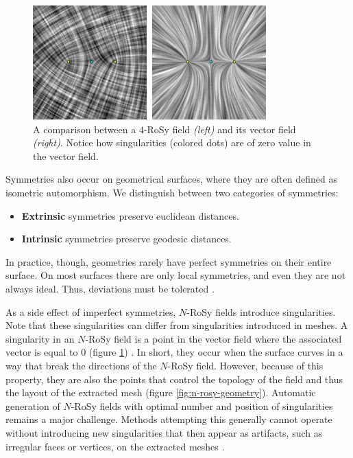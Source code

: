 \documentclass{ACGSeminar}
\begin{document}
\begin{figure}[htb!]
	\begin{centering}
		\includegraphics[width=9cm]{img/n-Rosy-Singularity.png}\par
	\end{centering}
	\caption{A comparison between a $4$-RoSy field \textit{(left)} and its vector field \textit{(right)}. Notice how singularities (colored dots) are of zero value in the vector field. \cite{palacios2007rotational}}
	\label{fig:n-rosy-singularities}
\end{figure}

Symmetries also occur on geometrical surfaces, where they are often defined as isometric automorphism. We distinguish between two categories of symmetries:
\begin{itemize}
	\item	\textbf{Extrinsic} symmetries preserve euclidean distances.
	\item	\textbf{Intrinsic} symmetries preserve geodesic distances.
\end{itemize}
In practice, though, geometries rarely have perfect symmetries on their entire surface. On most surfaces there are only local symmetries, and even they are not always ideal. Thus, deviations must be tolerated \cite{panozzo2012fields}.\bigskip

As a side effect of imperfect symmetries, $N$-RoSy fields introduce singularities. Note that these singularities can differ from singularities introduced in meshes. A singularity in an $N$-RoSy field is a point in the vector field where the associated vector is equal to 0 (figure \ref{fig:n-rosy-singularities}) \cite{palacios2007rotational}. In short, they occur when the surface curves in a way that break the directions of the $N$-RoSy field. However, because of this property, they are also the points that control the topology of the field and thus the layout of the extracted mesh (figure \ref{fig:n-rosy-geometry}). Automatic generation of $N$-RoSy fields with optimal number and position of singularities remains a major challenge. Methods attempting this generally cannot operate without introducing new singularities that then appear as artifacts, such as irregular faces or vertices, on the extracted meshes \cite{lai2009metric}.
\end{document}
